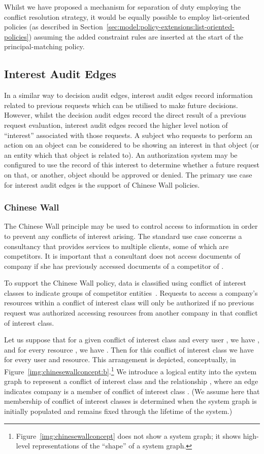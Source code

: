 \documentclass{article}
\begin{document}
Whilst we have proposed a mechanism for separation of duty employing the  conflict resolution strategy, it would be equally possible to employ list-oriented policies (as described in Section~\ref{sec:model:policy-extensions:list-oriented-policies}) assuming the added constraint rules are inserted at the start of the principal-matching policy.

\subsection{Interest Audit Edges}\label{sec:extended_typed_edges:interest_audit_edges}
In a similar way to decision audit edges, interest audit edges record information related to previous requests which can be utilised to make future decisions.
However, whilst the decision audit edges record the direct result of a previous request evaluation, interest audit edges record the higher level notion of ``interest'' associated with those requests.
A subject who requests to perform an action on an object can be considered to be showing an interest in that object (or an entity which that object is related to).
An authorization system may be configured to use the record of this interest to determine whether a future request on that, or another, object should be approved or denied.
The primary use case for interest audit edges is the support of Chinese Wall policies.

\subsubsection{Chinese Wall}\label{sec:extended_typed_edges:interest_audit_edges:chinese_wall}
The Chinese Wall principle may be used to control access to information in order to prevent any conflicts of interest arising.
The standard use case concerns a consultancy that provides services to multiple clients, some of which are competitors.
It is important that a consultant does not access documents of company  if she has previously accessed documents of a competitor of .

To support the Chinese Wall policy, data is classified using conflict of interest classes to indicate groups of competitor entities~\cite{BrewerN89}.
Requests to access a company's resources within a conflict of interest class will only be authorized if no previous request was authorized accessing resources from another company in that conflict of interest class.

Let us suppose that for a given conflict of interest class  and every user , we have , and for every resource , we have .
Then for this conflict of interest class we have  for every user and resource.
This arrangement is depicted, conceptually, in Figure~\ref{img:chinesewallconcept:b}.\footnote{Figure~\ref{img:chinesewallconcept} does not show a system graph; it shows high-level representations of the ``shape'' of a system graph.}
We introduce a logical entity into the system graph to represent a conflict of interest class and the relationship , where an edge  indicates company  is a member of conflict of interest class .
(We assume here that membership of conflict of interest classes is determined when the system graph is initially populated and remains fixed through the lifetime of the system.)
\end{document}
